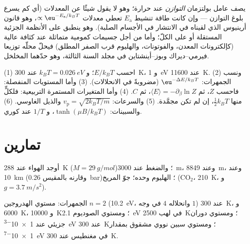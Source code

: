 \begin{remark}\label{rem:b2:boltzmann-factor:limits}
يصف عامل بولتزمان \emph{التوازن} عند حرارة؛ وهو
لا يقول شيئًا عن المعدلات (أي كم يسرع بلوغ التوازن --- وإن كانت
طاقة تنشيط $E_{\text{a}}$ تعطي معدلات $\propto\eu^{-E_{\text{a}}/k_BT}$،
وهو قانون أرينيوس الذي لقيناه في الانتشار في الأجسام الصلبة). وهو ينطبق على
الأنظمة الجزئية المستقلة أو على الكلّ؛ وأما من أجل جسيمات كمومية
متماثلة عند كثافة عالية (كإلكترونات المعدن، والفوتونات، والهليوم قرب
الصفر المطلق) فيحلّ محلّه توزيعا فيرمي--ديراك وبوز--أينشتاين
في مجلد السنة الثالثة، وهو حدّهما المخلخل.
\end{remark}

\begin{method}\label{meth:b2:boltzmann-factor:method}
(1) احسب $E/k_BT$؛ و $k_BT = \qty{0.026}{eV}$ عند \qty{300}{K}، و \qty{1}{eV}
عند \qty{11600}{K}. (2) ونسب الجمهرات: $\eu^{-\Delta E/k_BT}$ (مضروبةً
في الانحلالات). (3) وأما المستويات المنفصلة: فاحسب $Z$، ثم $\langle E\rangle =
-\partial_\beta\ln Z$، ثم $C$. (4) وأما المتغيرات المستمرة التربيعية:
فلكلٍّ منها $\tfrac12k_BT$، إن لم تكن مجمَّدة. (5) والسرعات: $v_{\text{p}} = \sqrt{2k_BT/m}$
والذيل الغاوسي. (6) والسبينات: $\tanh(\mu B/k_BT)$، و $1/T$ عند كوري.
\end{method}

\section{تمارين}

\begin{exercise}[$\star$]\label{exo:b2:boltzmann-factor:1}
أوجد  الهواء عند \qty{288}{K} ($M = \qty{29}{g/mol}$)؛ والضغط عند
\qty{3000}{m}، وعند \qty{8849}{m}، وعند \qty{10}{km} (وقارنه بالمقيس
\qty{0.26}{bar})؛  الهليوم وحده؛  جوّ المريخ
(CO$_2$، \qty{210}{K}، و $g = \qty{3.7}{m/s^2}$).
\end{exercise}

\begin{exercise}[$\star$]\label{exo:b2:boltzmann-factor:2}
الجمهرات: مستوي الهدروجين $n = 2$ (\qty{10.2}{eV}، وانحلاله $4$
في وجه $1$) عند \qty{300}{K}، و \qty{6000}{K}، و \qty{10000}{K}؛ ومستوي الصوديوم
\qty{2.1}{eV} في لهب \qty{2500}{K}؛ ومستوي دوران جزيئي عند
\qty{1e-3}{eV} عند \qty{300}{K}؛ ومستوي سبين نووي مشقوق بمقدار \qty{1e-7}{eV} في
مغنطيس عند \qty{300}{K}.
\end{exercise}

